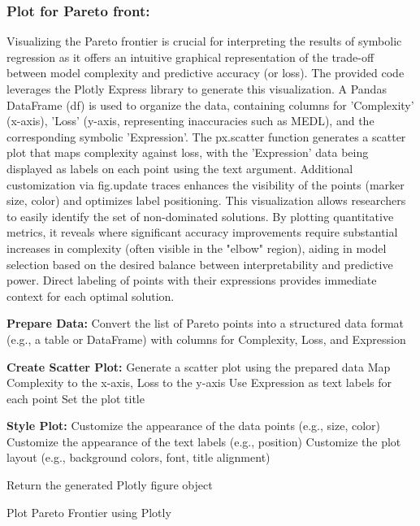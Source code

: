 \documentclass{article}
\begin{document}
\subsubsection{Plot for Pareto front:}



Visualizing the Pareto frontier is crucial for interpreting the results of symbolic regression as it offers an intuitive graphical representation of the trade-off between model complexity and predictive accuracy (or loss). The provided code leverages the Plotly Express library to generate this visualization. A Pandas DataFrame (df) is used to organize the data, containing columns for 'Complexity' (x-axis), 'Loss' (y-axis, representing inaccuracies such as MEDL), and the corresponding symbolic 'Expression'. The px.scatter function generates a scatter plot that maps complexity against loss, with the 'Expression' data being displayed as labels on each point using the text argument. Additional customization via fig.update traces enhances the visibility of the points (marker size, color) and optimizes label positioning. This visualization allows researchers to easily identify the set of non-dominated solutions. By plotting quantitative metrics, it reveals where significant accuracy improvements require substantial increases in complexity (often visible in the "elbow" region), aiding in model selection based on the desired balance between interpretability and predictive power. Direct labeling of points with their expressions provides immediate context for each optimal solution.\\



\begin{algorithm}[H]
\SetAlgoLined %

\textbf{Prepare Data:}\;
Convert the list of Pareto points into a structured data format (e.g., a table or DataFrame) with columns for Complexity, Loss, and Expression\;

\textbf{Create Scatter Plot:}\;
Generate a scatter plot using the prepared data\;
Map Complexity to the x-axis, Loss to the y-axis\;
Use Expression as text labels for each point\;
Set the plot title\;

\textbf{Style Plot:}\;
Customize the appearance of the data points (e.g., size, color)\;
Customize the appearance of the text labels (e.g., position)\;
Customize the plot layout (e.g., background colors, font, title alignment)\;

Return the generated Plotly figure object\;

\caption{Plot Pareto Frontier using Plotly}
\label{alg:plot_pareto_frontier} %
\end{algorithm}\\
\end{document}
